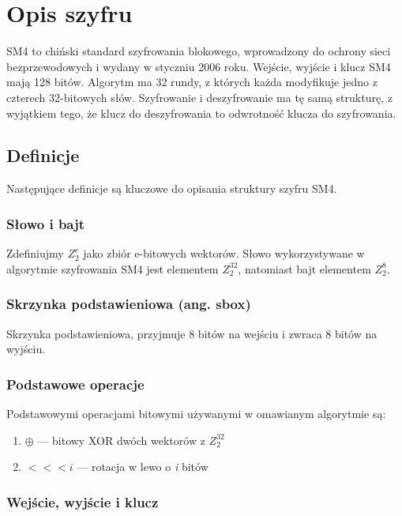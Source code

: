 \section{Opis szyfru\cite{4}}

SM4 to chiński standard szyfrowania blokowego, wprowadzony do ochrony sieci bezprzewodowych i wydany w styczniu 2006 roku. Wejście, wyjście i klucz SM4 mają 128 bitów.
Algorytm ma 32 rundy, z których każda modyfikuje jedno z czterech 32-bitowych słów. Szyfrowanie i
deszyfrowanie ma tę samą strukturę, z wyjątkiem tego, że klucz do deszyfrowania to
odwrotność klucza do szyfrowania.

\subsection{Definicje}

Następujące definicje są kluczowe do opisania struktury szyfru SM4.

\subsubsection{Słowo i bajt}

Zdefiniujmy $Z^{e}_{2}$ jako zbiór e-bitowych wektorów. Słowo wykorzystywane w algorytmie szyfrowania SM4 jest elementem $Z^{32}_{2}$, natomiast bajt elementem $Z^{8}_{2}$.

\subsubsection{Skrzynka podstawieniowa (ang. sbox)}

Skrzynka podstawieniowa, przyjmuje 8 bitów na wejściu i zwraca 8 bitów na wyjściu. 

\subsubsection{Podstawowe operacje}

Podstawowymi operacjami bitowymi używanymi w omawianym algorytmie są:
\begin{enumerate}
    \item $\oplus$ --- bitowy XOR dwóch wektorów z $Z^{32}_{2}$
    \item $<<< \textit{i}$ --- rotacja w lewo o \textit{i} bitów
\end{enumerate}

\subsubsection{Wejście, wyjście i klucz}

